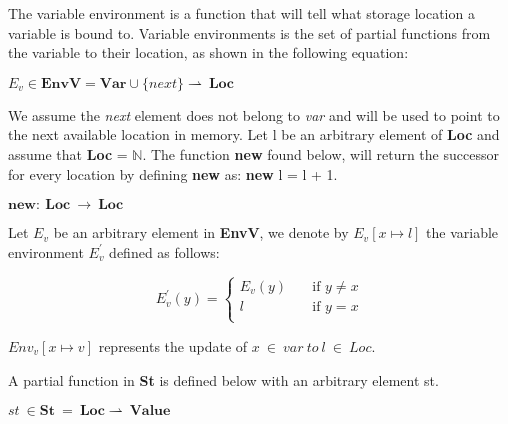   The variable environment is a function that will tell what storage location a variable is bound to. Variable environments  is the set of partial functions  from the variable to their location, as shown in the following equation:
  
  \begin{math}  
	 E_v \in \boldsymbol{EnvV} = \boldsymbol{Var} \cup \{ next \} \rightharpoonup \ \boldsymbol{Loc}
  \end{math}
  
  We assume the \textit{next} element does not belong to \textit{var} and will be used to point to the next available location in memory.
  Let l be an arbitrary element of \textbf{Loc} and assume that \textbf{Loc} = \begin{math} \mathbb{N}. \end{math} The function \textbf{new} found below, will return the successor for every location by defining \textbf{new} as: \textbf{new} l = l + 1.
  
  \begin{math}
	  \boldsymbol{new} : \ \boldsymbol{Loc} \ \rightarrow \ \boldsymbol{Loc}
  \end{math}
  
  Let \begin{math}E_v\end{math} be an arbitrary element in \textbf{EnvV}, we denote by \begin{math} E_v[x \mapsto l] \end{math} the variable environment \begin{math}E_v^{'} \end{math} defined as follows:
  
  \[ E^{'}_v(y) =
      \begin{cases}
        E_v(y)       & \quad \text{if } y \not= x\\
        l  & \quad \text{if } y = x\\
      \end{cases}
    \]
      
  \begin{math}Env_v[x \mapsto v] \end{math} represents the update of \begin{math} x \ \in \ var \ to \ l \ \in \ Loc.\end{math}    
  
  A partial function in \textbf{St} is defined below with an arbitrary element st.
  
  \begin{math}
	  st \ \in \boldsymbol{St} \ = \ \boldsymbol{Loc} \rightharpoonup \ \boldsymbol{Value}
  \end{math}
  
